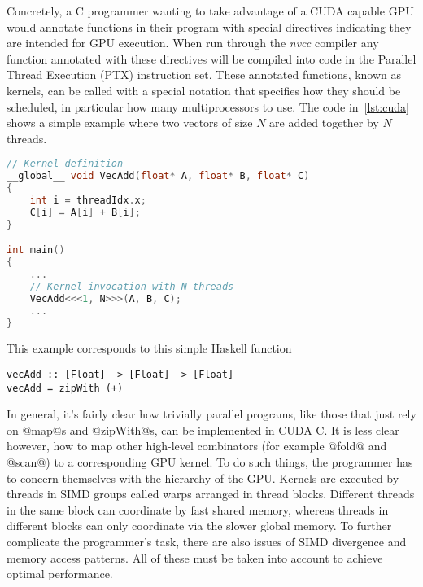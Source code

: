 Concretely, a C programmer wanting to take advantage of a CUDA capable GPU would annotate functions in their program with special directives indicating they are intended for GPU execution. When run through the \emph{nvcc} compiler any function annotated with these directives will be compiled into code in the Parallel Thread Execution (PTX) instruction set. These annotated functions, known as kernels, can be called with a special notation that specifies how they should be scheduled, in particular how many multiprocessors to use. The code in~\ref{lst:cuda} shows a simple example where two vectors of size $N$ are added together by $N$ threads.
%
\begin{lstlisting}[language=C, label=lst:cuda, caption={Adding two $N$ length vectors in CUDA C\citep{cuda}}]
// Kernel definition
__global__ void VecAdd(float* A, float* B, float* C)
{
    int i = threadIdx.x;
    C[i] = A[i] + B[i];
}

int main()
{
    ...
    // Kernel invocation with N threads
    VecAdd<<<1, N>>>(A, B, C);
    ...
}
\end{lstlisting}
%
This example corresponds to this simple Haskell function
%
\begin{lstlisting}
vecAdd :: [Float] -> [Float] -> [Float]
vecAdd = zipWith (+)
\end{lstlisting}

In general, it's fairly clear how trivially parallel programs, like those that just rely on @map@s and @zipWith@s, can be implemented in CUDA C. It is less clear however, how to map other high-level combinators (for example @fold@ and @scan@) to a corresponding GPU kernel. To do such things, the programmer has to concern themselves with the hierarchy of the GPU. Kernels are executed by threads in SIMD groups called warps arranged in thread blocks. Different threads in the same block can coordinate by fast shared memory, whereas threads in different blocks can only coordinate via the slower global memory. To further complicate the programmer's task, there are also issues of SIMD divergence and memory access patterns. All of these must be taken into account to achieve optimal performance.


